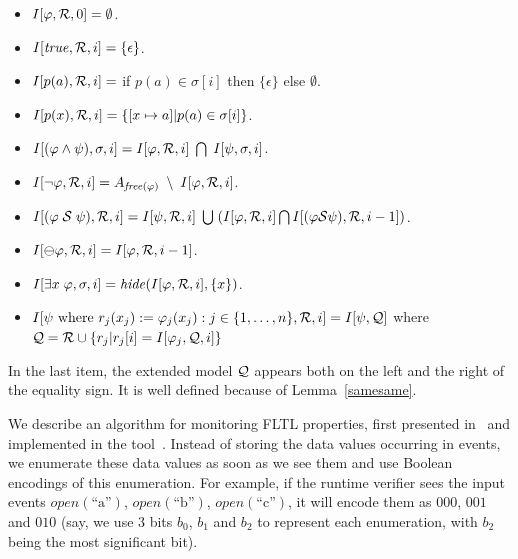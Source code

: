 \begin{itemize}
\item $I [ \varphi , {\cal R} , 0 ] = \emptyset$.
\item $I [ \mathit{true} , {\cal R} , i ] = \{ \epsilon \}$.
\item $I [ p ( a ) , {\cal R} , i ] =$ if $p ( a ) \in \sigma [ i ]$ then
$\{ \epsilon \}$ else $\emptyset$.
\item $I [ p ( x ) , {\cal R} , i ] = \{ [ x \mapsto a ] | p ( a ) \in
\sigma [ i ] \}$.
\item $I [ ( \varphi \wedge \psi ) , \sigma , i ] = 
I [ \varphi , {\cal R} , i ] \;  \bigcap \; I [ \psi , \sigma , i ]$.
\item $I [ \neg \varphi , {\cal R} , i ] = 
A_{\mathit{free} ( \varphi )} \; \setminus \; I [ \varphi , {\cal R} , i ]$.
\item $I [ ( \varphi \; {\cal S} \; \psi ) , {\cal R} , i ] = 
I [ \psi , {\cal R}, i ] \; \bigcup \;
( I [ \varphi , {\cal R} , i ] \bigcap 
I [ (\varphi {\cal S} \psi ) , {\cal R} , i - 1 ] )$.
\item $I [ \ominus \varphi , {\cal R} , i ] = I [ \varphi , {\cal R} , i-1 ]$.
\item $I [ \exists x \; \varphi , \sigma , i ] = 
\mathit{hide} ( I [ \varphi , {\cal R} , i ] , \{ x \} )$.
\item $I [ \psi \mathrm{\ where\ } r_j ( x_j) := 
\varphi_j (x_j) : j \in \{ 1 , \ldots , n \} , {\cal R} , i ] = 
 I [ \psi , {\cal Q} ] $ where ${\cal Q} = {\cal R} \cup
\{ r_j | r_j [ i ] =  I [ 
\varphi_j , {\cal Q} , i ] \}$
\end{itemize}
In the last item, the extended model ${\cal Q}$ appears both on the left and the right of the equality sign. It is well defined because of Lemma~\ref{samesame}.

We describe an algorithm for monitoring 
FLTL properties, first presented in~\cite{HPU} and implemented
in the tool~\dejavu. 
Instead of storing the data values occurring in events, 
we enumerate these data values as soon as we see them and use Boolean
encodings of this enumeration.
For example, if the runtime verifier sees the input 
events 
$\mathit{open}(\text{``a''})$, 
$\mathit{open}(\text{``b''})$, 
$\mathit{open}(\text{``c''})$, 
it will encode them as
$000$, $001$ and $010$ (say, we use 3 bits $b_0$, $b_1$ and $b_2$
to represent each enumeration, with $b_2$ being the most significant bit).

